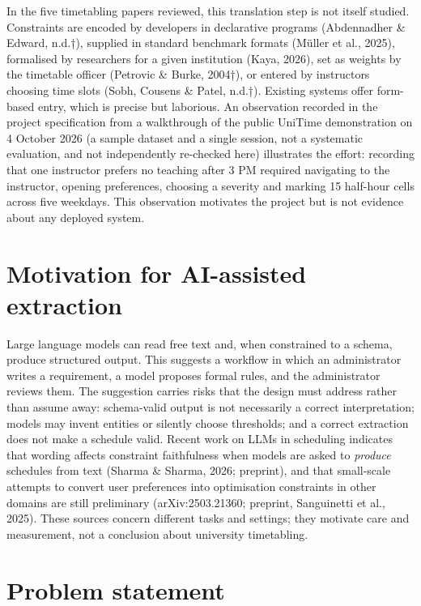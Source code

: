 \documentclass[
  11pt,a4paper,oneside]{report}
\begin{document}
In the five timetabling papers reviewed, this translation step is not itself
studied. Constraints are encoded by developers in declarative programs
(Abdennadher \& Edward, n.d.†),
supplied in standard benchmark formats (Müller et al., 2025), formalised
by researchers for a given institution (Kaya, 2026), set as weights by
the timetable officer (Petrovic \& Burke, 2004†), or entered by
instructors choosing time slots (Sobh, Cousens \& Patel, n.d.†).
Existing systems offer form-based entry, which is precise but laborious.
An observation recorded in the project specification from a walkthrough
of the public UniTime demonstration on 4 October 2026 (a sample dataset
and a single session, not a systematic evaluation, and not independently
re-checked here) illustrates the effort: recording that one instructor
prefers no teaching after 3 PM required navigating to the instructor,
opening preferences, choosing a severity and marking 15 half-hour cells
across five weekdays. This observation motivates the project but is not
evidence about any deployed system.

\hypertarget{motivation-for-ai-assisted-extraction}{%
\section{Motivation for AI-assisted
extraction}\label{motivation-for-ai-assisted-extraction}}

Large language models can read free text and, when constrained to a
schema, produce structured output. This suggests a workflow in which an
administrator writes a requirement, a model proposes formal rules, and
the administrator reviews them. The suggestion carries risks that the
design must address rather than assume away: schema-valid output is not
necessarily a correct interpretation; models may invent entities or
silently choose thresholds; and a correct extraction does not make a
schedule valid. Recent work on LLMs in scheduling indicates that wording
affects constraint faithfulness when models are asked to \emph{produce}
schedules from text (Sharma \& Sharma, 2026; preprint), and that
small-scale attempts to convert user preferences into optimisation
constraints in other domains are still preliminary (arXiv:2503.21360;
preprint, Sanguinetti et al., 2025). These sources concern different tasks
and settings; they motivate care and measurement, not a conclusion about
university timetabling.

\hypertarget{problem-statement}{%
\section{Problem statement}\label{problem-statement}}
\end{document}
